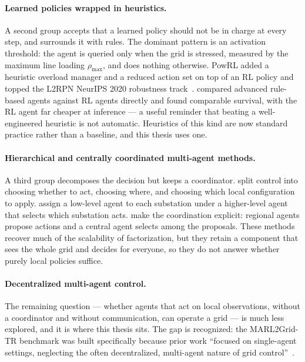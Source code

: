 \paragraph{Learned policies wrapped in heuristics.}
A second group accepts that a learned policy should not be in charge at every
step, and surrounds it with rules. The dominant pattern is an activation
threshold: the agent is queried only when the grid is stressed, measured by the
maximum line loading $\rho_{\max}$, and does nothing otherwise. PowRL added a
heuristic overload manager and a reduced action set on top of an RL policy and
topped the L2RPN NeurIPS 2020 robustness track~\cite{chauhan2023powrl}.
\textcite{lehna2023comparative} compared advanced rule-based agents against RL
agents directly and found comparable survival, with the RL agent far cheaper at
inference --- a useful reminder that beating a well-engineered heuristic is not
automatic. Heuristics of this kind are now standard practice rather than a
baseline, and this thesis uses one.

\paragraph{Hierarchical and centrally coordinated multi-agent methods.}
A third group decomposes the decision but keeps a coordinator.
\textcite{manczak2023hrl} split control into choosing whether to act, choosing
where, and choosing which local configuration to apply.
\textcite{vandersar2023hmarl} assign a low-level agent to each substation under a
higher-level agent that selects which substation acts.
\textcite{demol2025ccma} make the coordination explicit: regional agents propose
actions and a central agent selects among the proposals. These methods recover
much of the scalability of factorization, but they retain a component that sees
the whole grid and decides for everyone, so they do not answer whether purely
local policies suffice.

\paragraph{Decentralized multi-agent control.}
The remaining question --- whether agents that act on local observations, without
a coordinator and without communication, can operate a grid --- is much less
explored, and it is where this thesis sits. The gap is recognized: the
MARL2Grid-TR benchmark was built specifically because prior work
``focused on single-agent settings, neglecting the often decentralized,
multi-agent nature of grid control''~\cite{marchesini2026marl2grid}.

